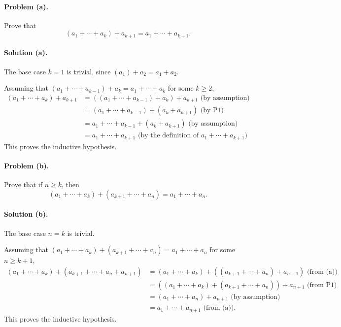 \documentclass{article}
\begin{document}
\paragraph{Problem (a).} Prove that \begin{equation*}
  (a_1 + \cdots + a_k) + a_{k+1} = a_1 + \cdots + a_{k+1}.
\end{equation*}

\paragraph{Solution (a).} The base case $k = 1$ is trivial, since $(a_1) + a_2 = a_1 + a_2$.

Assuming that $(a_1 + \cdots + a_{k-1}) + a_k = a_1 + \cdots + a_k$ for some $k \geq 2$, \begin{align*}
  (a_1 + \cdots + a_k) + a_{k+1} &= ((a_1 + \cdots + a_{k-1}) + a_k) + a_{k+1} \text{ (by assumption)} \\
                                 &= (a_1 + \cdots + a_{k-1}) + (a_k + a_{k+1}) \text{ (by P1)} \\
                                 &= a_1 + \cdots + a_{k-1} + (a_k + a_{k+1}) \text{ (by assumption)} \\
                                 &= a_1 + \cdots + a_{k+1} \text{ (by the definition of } a_1 + \cdots + a_{k+1} \text{)}
\end{align*} This proves the inductive hypothesis.

\paragraph{Problem (b).} Prove that if $n \geq k$, then \begin{equation*}
  (a_1 + \cdots + a_k) + (a_{k+1} + \cdots + a_n) = a_1 + \cdots + a_n.
\end{equation*}

\paragraph{Solution (b).} The base case $n = k$ is trivial.

Assuming that $(a_1 + \cdots + a_k) + (a_{k+1} + \cdots + a_n) = a_1 + \cdots + a_n$ for some $n \geq k + 1$, \begin{align*}
  (a_1 + \cdots + a_k) + (a_{k+1} + \cdots + a_n + a_{n+1}) &= (a_1 + \cdots + a_k) + ((a_{k+1} + \cdots + a_n) + a_{n+1}) \text{ (from (a))} \\
                                                            &= ((a_1 + \cdots + a_k) + (a_{k+1} + \cdots + a_n)) + a_{n+1} \text{ (from P1)} \\
                                                            &= (a_1 + \cdots + a_n) + a_{n+1} \text{ (by assumption)} \\
                                                            &= a_1 + \cdots + a_{n+1} \text{ (from (a))}.
\end{align*} This proves the inductive hypothesis.
\end{document}
